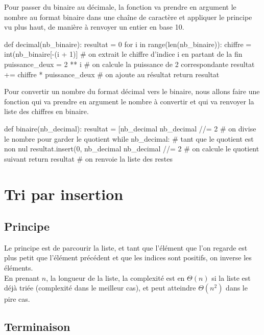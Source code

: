 		Pour passer du binaire au décimale, la fonction va prendre en argument le nombre au format binaire dans une chaîne de caractère et appliquer le principe vu plus haut, de manière à renvoyer un entier en base 10.
		\begin{pythoncode}
			def decimal(nb_binaire):
				resultat = 0
				for i in range(len(nb_binaire)):
					chiffre = int(nb_binaire[-(i + 1)] # on extrait le chiffre d'indice i en partant de la fin
					puissance_deux = 2 ** i # on calcule la puissance de 2 correspondante
					resultat += chiffre * puissance_deux # on ajoute au résultat
				return resultat
		\end{pythoncode}
		
		Pour convertir un nombre du format décimal vers le binaire, nous allons faire une fonction qui va prendre en argument le nombre à convertir et qui va renvoyer la liste des chiffres en binaire.
		\begin{pythoncode}
			def binaire(nb_decimal):
				resultat = [nb_decimal %
				nb_decimal //= 2 # on divise le nombre pour garder le quotient
				while nb_decimal: # tant que le quotient est non nul
					resultat.insert(0, nb_decimal %
					nb_decimal //= 2 # on calcule le quotient suivant
				return resultat # on renvoie la liste des restes
		\end{pythoncode}

\section{Tri par insertion}
	
	\subsection{Principe}
		
		Le principe est de parcourir la liste, et tant que l'élément que l'on regarde est plus petit que l'élément précédent et que les indices sont positifs, on inverse les éléments.\\
		
		En prenant $n$, la longueur de la liste, la complexité est en $\Theta(n)$ si la liste est déjà triée (complexité dans le meilleur cas), et peut atteindre $\Theta(n^2)$ dans le pire cas.
		
	\subsection{Terminaison}
		

